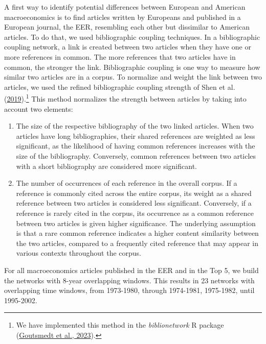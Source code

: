 \documentclass[
  12pt,
  onecolumn]{article}
\begin{document}
A first way to identify potential differences between European and American macroeconomics is to find articles written by Europeans and published in a European journal, the EER, resembling each other but dissimilar to American articles. To do that, we used bibliographic coupling techniques. In a bibliographic coupling network, a link is created between two articles when they have one or more references in common. The more references that two articles have in common, the stronger the link. Bibliographic coupling is one way to measure how similar two articles are in a corpus. To normalize and weight the link between two articles, we used the refined bibliographic coupling strength of Shen et al. (\protect\hyperlink{ref-shen2019}{2019}).\footnote{We have implemented this method in the \emph{biblionetwork} R package (\protect\hyperlink{ref-goutsmedt2023}{Goutsmedt et al., 2023}).} This method normalizes the strength between articles by taking into account two elements:

\begin{enumerate}
\def\labelenumi{\arabic{enumi}.}
\item
  The size of the respective bibliography of the two linked articles. When two articles have long bibliographies, their shared references are weighted as less significant, as the likelihood of having common references increases with the size of the bibliography. Conversely, common references between two articles with a short bibliography are considered more significant.
\item
  The number of occurrences of each reference in the overall corpus. If a reference is commonly cited across the entire corpus, its weight as a shared reference between two articles is considered less significant. Conversely, if a reference is rarely cited in the corpus, its occurrence as a common reference between two articles is given higher significance. The underlying assumption is that a rare common reference indicates a higher content similarity between the two articles, compared to a frequently cited reference that may appear in various contexts throughout the corpus.
\end{enumerate}

For all macroeconomics articles published in the EER and in the Top 5, we build the networks with 8-year overlapping windows. This results in 23 networks with overlapping time windows, from 1973-1980, through 1974-1981, 1975-1982, until 1995-2002.
\end{document}
